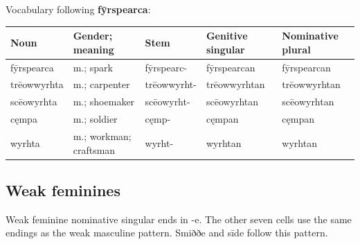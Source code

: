 \par\begin{minipage}{\linewidth}\raggedright
Vocabulary following \textbf{fȳrspearca}:

\par\begingroup
\fontsize{10.5}{13.2}\selectfont
\setlength{\LTleft}{0pt}\setlength{\LTright}{\fill}
\noindent
\begin{tabular}{@{}>{\raggedright\arraybackslash}p{21.5mm}>{\raggedright\arraybackslash}p{21.57mm}>{\raggedright\arraybackslash}p{20.5mm}>{\raggedright\arraybackslash}p{24.59mm}>{\raggedright\arraybackslash}p{24.59mm}@{}}
\toprule
\textbf{Noun} & \textbf{Gender; meaning} & \textbf{Stem} & \textbf{Genitive singular} & \textbf{Nominative plural} \\
\midrule
fȳrspearca & m.; spark & fȳrspearc- & fȳrspearcan & fȳrspearcan \\
trēowwyrhta & m.; carpenter & trēowwyrht- & trēowwyrhtan & trēowwyrhtan \\
scēowyrhta & m.; shoemaker & scēowyrht- & scēowyrhtan & scēowyrhtan \\
cęmpa & m.; soldier & cęmp- & cęmpan & cęmpan \\
wyrhta & m.; workman; craftsman & wyrht- & wyrhtan & wyrhtan \\
\bottomrule
\end{tabular}
\par\endgroup

\end{minipage}\par
{}
\subsection*{Weak feminines}

Weak feminine nominative singular ends in -e. The other seven cells use the same endings as the weak masculine pattern. Smiððe and sīde follow this pattern.

